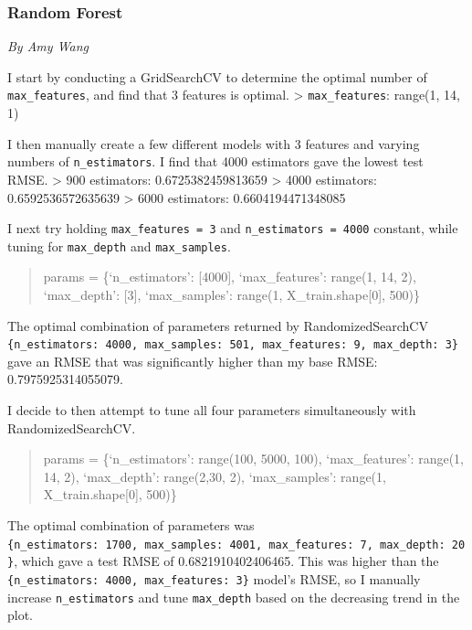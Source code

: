 \documentclass[
  letterpaper,
  DIV=11,
  numbers=noendperiod]{scrartcl}
\begin{document}
\hypertarget{random-forest}{%
\subsubsection{Random Forest}\label{random-forest}}

\emph{By Amy Wang}

I start by conducting a GridSearchCV to determine the optimal number of
\texttt{max\_features}, and find that 3 features is optimal.
\textgreater{} \texttt{max\_features}: range(1, 14, 1)

I then manually create a few different models with 3 features and
varying numbers of \texttt{n\_estimators}. I find that 4000 estimators
gave the lowest test RMSE. \textgreater{} 900 estimators:
0.6725382459813659 \textgreater{} 4000 estimators: 0.6592536572635639
\textgreater{} 6000 estimators: 0.6604194471348085

I next try holding \texttt{max\_features\ =\ 3} and
\texttt{n\_estimators\ =\ 4000} constant, while tuning for
\texttt{max\_depth} and \texttt{max\_samples}.

\begin{quote}
params = \{`n\_estimators': {[}4000{]}, `max\_features': range(1, 14,
2), `max\_depth': {[}3{]}, `max\_samples': range(1,
X\_train.shape{[}0{]}, 500)\}
\end{quote}

The optimal combination of parameters returned by RandomizedSearchCV
\texttt{\{\textquotesingle{}n\_estimators\textquotesingle{}:\ 4000,\ \textquotesingle{}max\_samples\textquotesingle{}:\ 501,\ \textquotesingle{}max\_features\textquotesingle{}:\ 9,\ \textquotesingle{}max\_depth\textquotesingle{}:\ 3\}}
gave an RMSE that was significantly higher than my base RMSE:
0.7975925314055079.

I decide to then attempt to tune all four parameters simultaneously with
RandomizedSearchCV.

\begin{quote}
params = \{`n\_estimators': range(100, 5000, 100), `max\_features':
range(1, 14, 2), `max\_depth': range(2,30, 2), `max\_samples': range(1,
X\_train.shape{[}0{]}, 500)\}
\end{quote}

The optimal combination of parameters was
\texttt{\{\textquotesingle{}n\_estimators\textquotesingle{}:\ 1700,\ \textquotesingle{}max\_samples\textquotesingle{}:\ 4001,\ \textquotesingle{}max\_features\textquotesingle{}:\ 7,\ \textquotesingle{}max\_depth\textquotesingle{}:\ 20\}},
which gave a test RMSE of 0.6821910402406465. This was higher than the
\texttt{\{\textquotesingle{}n\_estimators\textquotesingle{}:\ 4000,\ \textquotesingle{}max\_features\textquotesingle{}:\ 3\}}
model's RMSE, so I manually increase \texttt{n\_estimators} and tune
\texttt{max\_depth} based on the decreasing trend in the plot.
\end{document}
